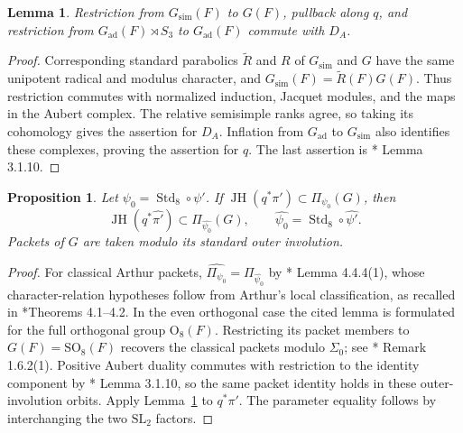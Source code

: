 \documentclass[12pt]{amsart}
\theoremstyle{definition}
\theoremstyle{plain}
\newtheorem{proposition}[definition]{Proposition}
\newtheorem{lemma}[definition]{Lemma}
\theoremstyle{remark}
\def\SL{\mathrm{SL}}
\def\SO{\mathrm{SO}}
\DeclareMathOperator{\Std}{Std}
\numberwithin{equation}{section}
\begin{document}
\begin{lemma}\label{lem:Aubert-restriction}
Restriction from $G_{\mathrm{sim}}(F)$ to $G(F)$, pullback along $q$,
and restriction from $G_{\mathrm{ad}}(F)\rtimes S_3$ to $G_{\mathrm{ad}}(F)$ commute with $D_A$.
\end{lemma}
\begin{proof}
Corresponding standard parabolics $\widetilde R$ and $R$ of
$G_{\mathrm{sim}}$ and $G$ have the same unipotent radical and modulus
character, and
$G_{\mathrm{sim}}(F)=\widetilde R(F)G(F)$. Thus restriction commutes with
normalized induction, Jacquet modules, and the maps in the Aubert
complex. The relative semisimple ranks agree, so taking its cohomology
gives the assertion for $D_A$. Inflation from $G_{\mathrm{ad}}$ to $G_{\mathrm{sim}}$
also identifies these complexes, proving the assertion for $q$.
The last assertion is
\cite{ChengKaletha2026-AubertBernsteinInvolutionsDisconnectedGroups}*{
Lemma 3.1.10}.
\end{proof}

\begin{proposition}\label{prop:standard-Aubert}
Let $\psi_0=\Std_8\circ\psi'$. If
$\operatorname{JH}(q^*\pi')\subset\Pi_{\psi_0}(G)$, then
\[
 \operatorname{JH}(q^*\widehat{\pi'})
       \subset\Pi_{\widehat{\psi_0}}(G),\qquad
 \widehat{\psi_0}=\Std_8\circ\widehat{\psi'}.
\]
Packets of $G$ are taken modulo its standard outer involution.
\end{proposition}
\begin{proof}
For classical Arthur packets,
$\widehat{\Pi_{\psi_0}}=\Pi_{\widehat{\psi_0}}$ by
\cite{AtobeGanEtAl2025-LocalIntertwiningRelationsCoTemperedPackets}*{
Lemma 4.4.4(1)}, whose character-relation hypotheses follow from
Arthur's local classification, as recalled in
\cite{Xu2017-MoeglinParametrizationArthurPackets}*{Theorems 4.1--4.2}.
In the even orthogonal case the cited lemma is formulated for the
full orthogonal group $\mathrm O_8(F)$. Restricting its packet members
to $G(F)=\SO_8(F)$ recovers the classical packets modulo $\Sigma_0$;
see \cite{AtobeGanEtAl2025-LocalIntertwiningRelationsCoTemperedPackets}*{
Remark 1.6.2(1)}.
Positive Aubert duality commutes with restriction to the identity
component by
\cite{ChengKaletha2026-AubertBernsteinInvolutionsDisconnectedGroups}*{
Lemma 3.1.10}, so the same packet identity holds in these
outer-involution orbits. Apply Lemma~\ref{lem:Aubert-restriction}
to $q^*\pi'$. The parameter equality follows
by interchanging the two $\SL_2$ factors.
\end{proof}
\end{document}
